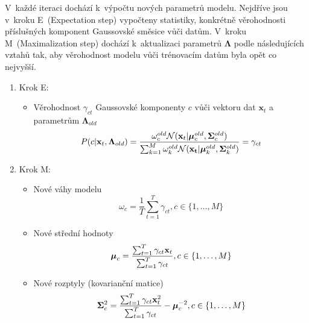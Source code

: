 V~každé iteraci dochází k~výpočtu nových parametrů modelu. Nejdříve jsou v~kroku E~(Expectation step) vypočteny statistiky, konkrétně věrohodnosti příslušných komponent Gaussovské směsice vůči datům. V~kroku M~(Maximalization step) dochází k~aktualizaci parametrů $\mathbf{\Lambda}$ podle následujících vztahů tak, aby věrohodnost modelu vůči trénovacím datům byla opět co nejvyšší.
\begin{enumerate}
    \item Krok E: \begin{itemize}
                        \item Věrohodnost $\gamma_{ct}$ Gaussovské komponenty $c$ vůči vektoru dat $\mathbf{x}_{t}$ a parametrům $\mathbf{\Lambda}_{old}$
                            \begin{equation}
                                \label{eqn:GMM_components}
                                P(c|\mathbf{x}_t, \mathbf{\Lambda}_{old}) = \frac{\omega_c^{old} \mathcal{N}(\mathbf{x}_{t}|\text{\boldmath$\mu$}_{c}^{old},\mathbf{\Sigma}_{c}^{old})}{\sum_{k=1}^{M}\omega_k^{old} \mathcal{N}(\mathbf{x_t}|\text{\boldmath$\mu$}_{k}^{old},\mathbf{\Sigma}_{k}^{old})} = \gamma_{ct}
                            \end{equation}
                    \end{itemize}
    \item Krok M:   \begin{itemize}
                        \item Nové váhy modelu
                            \begin{equation}
                                \label{eqn:GMM_weights}
                                \omega_c = \frac{1}{T} \sum_{t=1}^T \gamma_{ct}, c \in \{1, \dots, M\}
                            \end{equation}
                        \item Nové střední hodnoty
                            \begin{equation}
                                \label{eqn:GMM_means}
                                \text{\boldmath$\mu$}_c = \frac{\sum_{t=1}^{T} \gamma_{ct} \mathbf{x}_{t}}{\sum_{t=1}^T \gamma_{ct}},c \in \{1, \dots, M\}
                            \end{equation}
                        \item Nové rozptyly (kovarianční matice)
                            \begin{equation}
                                \label{eqn:GMM_cov}
                                \mathbf{\Sigma}_c^{2} = \frac{\sum_{t=1}^{T} \gamma_{ct} \mathbf{x}_t^{2}}{\sum_{t=1}^T \gamma_{ct}} - \text{\boldmath$\mu$}_c^{-2}, c \in \{1, \dots, M\}
                            \end{equation}
                    \end{itemize}
\end{enumerate}

